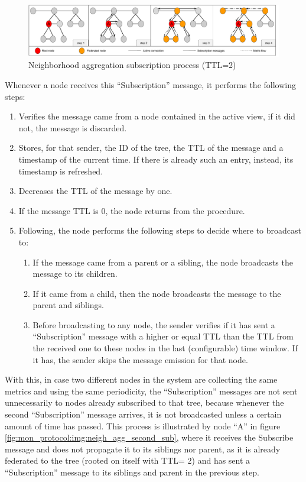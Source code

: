 \begin{figure}[htbp]
    \centering
    \includegraphics[width=\textwidth]{Chapters/aggregation/images/neigh-agg-subscribe.pdf}
    \caption{Neighborhood aggregation subscription process (TTL=2)}
    \label{fig:mon_protocol:img:neigh_agg_sub}
\end{figure}
     
Whenever a node receives this ``Subscription'' message, it performs the following steps:

\begin{enumerate} \label{sec:mon_protocol:enum:neigh_agg_sub_opts}
    \item Verifies the message came from a node contained in the active view, if it did not, the message is discarded.
    \item Stores, for that sender, the ID of the tree, the TTL of the message and a timestamp of the current time. If there is already such an entry, instead, its timestamp is refreshed.
    \item Decreases the TTL of the message by one.
    \item If the message TTL is 0, the node returns from the procedure.
    \item Following, the node performs the following steps to decide where to broadcast to:
            \begin{enumerate}
                \item If the message came from a parent or a sibling, the node broadcasts the message to its children.
                \item If it came from a child, then the node broadcasts the message to the parent and siblings.
                \item Before broadcasting to any node, the sender verifies if it has sent a ``Subscription'' message with a higher or equal TTL than the TTL from the received one to these nodes in the last (configurable) time window. If it has, the sender skips the message emission for that node.
            \end{enumerate}
\end{enumerate}

With this, in case two different nodes in the system are collecting the same metrics and using the same periodicity, the ``Subscription'' messages are not sent unnecessarily to nodes already subscribed to that tree, because whenever the second ``Subscription'' message arrives, it is not broadcasted unless a certain amount of time has passed. This process is illustrated by node ``A'' in figure \ref{fig:mon_protocol:img:neigh_agg_second_sub}, where it receives the Subscribe message and does not propagate it to its siblings nor parent, as it is already federated to the tree (rooted on itself with TTL= 2) and has sent a ``Subscription'' message to its siblings and parent in the previous step.

